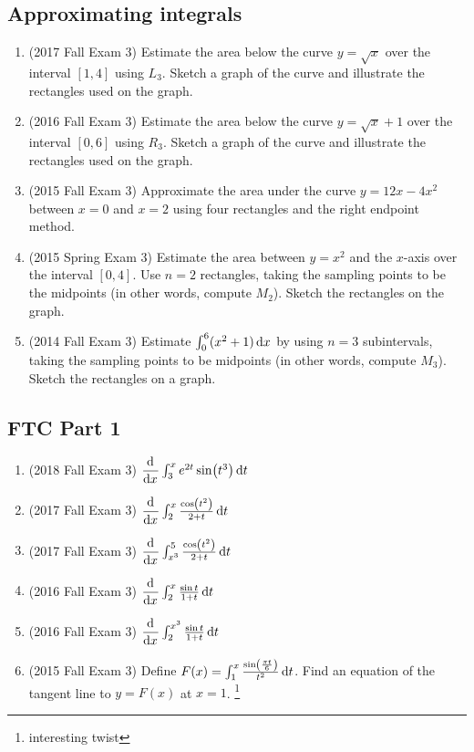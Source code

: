 \documentclass[10pt]{scrartcl}
\begin{document}
\subsection{Approximating integrals}
\begin{enumerate}
\item (2017 Fall Exam 3) Estimate the area below the curve $y = \sqrt x$ over the interval $[1, 4]$ using $L_3$. Sketch a graph of the curve and illustrate the rectangles used on the graph.
\item (2016 Fall Exam 3) Estimate the area below the curve $y = \sqrt x + 1$ over the interval $[0, 6]$ using $R_3$. Sketch a graph of the curve and illustrate the rectangles used on the graph.
\item (2015 Fall Exam 3) Approximate the area under the curve $y = 12x - 4x^2$ between $x = 0$ and $x = 2$ using four rectangles and the right endpoint method.
\item (2015 Spring Exam 3) Estimate the area between $y = x^2$ and the $x$-axis over the interval $[0, 4]$. Use $n = 2$ rectangles, taking the sampling points to be the midpoints (in other words, compute $M_2$). Sketch the rectangles on the graph.
\item (2014 Fall Exam 3) Estimate $\int_0^6 (x^2 + 1) \dif x$ by using $n = 3$ subintervals, taking the sampling points to be midpoints (in other words, compute $M_3$). Sketch the rectangles on a graph. 
\end{enumerate}

\subsection{FTC Part 1}
\begin{enumerate}
\item (2018 Fall Exam 3) $\dod{}{x} \int_3^x e^{2t} \sin(t^3) \dif t$
\item (2017 Fall Exam 3) $\dod{}{x} \int_2^x \frac{\cos(t^2)}{2+t} \dif t$
\item (2017 Fall Exam 3) $\dod{}{x} \int_{x^3}^5 \frac{\cos(t^2)}{2+t} \dif t$
\item (2016 Fall Exam 3) $\dod{}{x} \int_2^x \frac{\sin t}{1+t} \dif t$
\item (2016 Fall Exam 3) $\dod{}{x} \int_2^{x^3} \frac{\sin t}{1+t} \dif t$
\item (2015 Fall Exam 3) Define $F(x) = \int_1^x \frac{\sin(\frac{\pi t}{6})}{t^2} \dif t$. Find an equation of the tangent line to $y = F(x)$ at $x = 1$. \footnote{interesting twist}
\end{enumerate}
\end{document}
